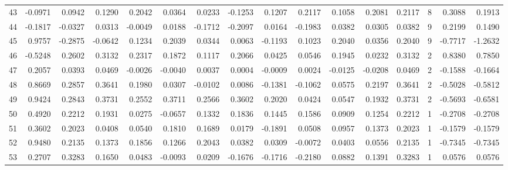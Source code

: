 \begin{tabular}{lrrrrrrrrrrrrrrr}
43  &     -0.0971 &  0.0942 &  0.1290 &  0.2042 &  0.0364 &  0.0233 & -0.1253 &  0.1207 &  0.2117 &  0.1058 &   0.2081 &     0.2117 &      8 &                    0.3088 &                     0.1913 \\
44  &     -0.1817 & -0.0327 &  0.0313 & -0.0049 &  0.0188 & -0.1712 & -0.2097 &  0.0164 & -0.1983 &  0.0382 &   0.0305 &     0.0382 &      9 &                    0.2199 &                     0.1490 \\
45  &      0.9757 & -0.2875 & -0.0642 &  0.1234 &  0.2039 &  0.0344 &  0.0063 & -0.1193 &  0.1023 &  0.2040 &   0.0356 &     0.2040 &      9 &                   -0.7717 &                    -1.2632 \\
46  &     -0.5248 &  0.2602 &  0.3132 &  0.2317 &  0.1872 &  0.1117 &  0.2066 &  0.0425 &  0.0546 &  0.1945 &   0.0232 &     0.3132 &      2 &                    0.8380 &                     0.7850 \\
47  &      0.2057 &  0.0393 &  0.0469 & -0.0026 & -0.0040 &  0.0037 &  0.0004 & -0.0009 &  0.0024 & -0.0125 &  -0.0208 &     0.0469 &      2 &                   -0.1588 &                    -0.1664 \\
48  &      0.8669 &  0.2857 &  0.3641 &  0.1980 &  0.0307 & -0.0102 &  0.0086 & -0.1381 & -0.1062 &  0.0575 &   0.2197 &     0.3641 &      2 &                   -0.5028 &                    -0.5812 \\
49  &      0.9424 &  0.2843 &  0.3731 &  0.2552 &  0.3711 &  0.2566 &  0.3602 &  0.2020 &  0.0424 &  0.0547 &   0.1932 &     0.3731 &      2 &                   -0.5693 &                    -0.6581 \\
50  &      0.4920 &  0.2212 &  0.1931 &  0.0275 & -0.0657 &  0.1332 &  0.1836 &  0.1445 &  0.1586 &  0.0909 &   0.1254 &     0.2212 &      1 &                   -0.2708 &                    -0.2708 \\
51  &      0.3602 &  0.2023 &  0.0408 &  0.0540 &  0.1810 &  0.1689 &  0.0179 & -0.1891 &  0.0508 &  0.0957 &   0.1373 &     0.2023 &      1 &                   -0.1579 &                    -0.1579 \\
52  &      0.9480 &  0.2135 &  0.1373 &  0.1856 &  0.1266 &  0.2043 &  0.0382 &  0.0309 & -0.0072 &  0.0403 &   0.0556 &     0.2135 &      1 &                   -0.7345 &                    -0.7345 \\
53  &      0.2707 &  0.3283 &  0.1650 &  0.0483 & -0.0093 &  0.0209 & -0.1676 & -0.1716 & -0.2180 &  0.0882 &   0.1391 &     0.3283 &      1 &                    0.0576 &                     0.0576 \\

\end{tabular}
